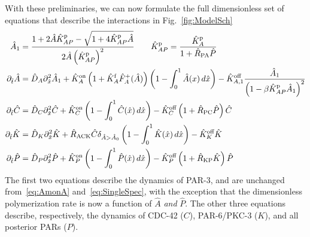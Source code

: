 \documentclass[11pt]{article}
\newcommand{\6}[1]{#1_{\text{6}}}
\newcommand{\3}[1]{#1_{\text{3}}}
\begin{document}
With these preliminaries, we can now formulate the full dimensionless set of equations that describe the  interactions in Fig.\ \ref{fig:ModelSch}
\begin{subequations}
\label{eq:AllBC}
\begin{align}
\nonumber
\hat A_1 &= \frac{1+2\hat A \hat{K}^\text{p}_{AP}-\sqrt{1+4 \hat{K}^\text{p}_{AP} \hat A}}{2 \hat A \left(\hat{K}^\text{p}_{AP}\right)^2} \qquad \hat{K}^\text{p}_{AP}=\frac{\hat{K}^\text{p}_A}{1+\hat R_\text{PA} \hat P}\\ 
\partial_{\hat{t}} \hat A &= \hat{D}_A \partial_{\hat{x}}^2 \hat A_1+\hat{K}^\text{on}_A \left(1+\hat{K}^\text{f}_A \hat F_A^+(\hat A) \right)\left(1 - \int_0^1 \hat A(x) \, d\hat{x} \right) - \hat{K}^\text{off}_{A,1}  \frac{\hat A_1}{\left(1-\beta \hat{K}^\text{p}_{AP} \hat A_1\right)^2}\\
\label{eq:Ceqn}
\partial_{\hat{t}} \hat{C}& =\hat{D}_C \partial_{\hat{x}}^2 \hat{C} +\hat{K}^\text{on}_C \left(1 - \int_0^1 \hat{C}(\hat x) \, d\hat{x} \right)  - \hat{K}^\text{off}_C \left(1+\hat{R}_\text{PC}\hat P\right)\hat{C}\\
\label{eq:Keqn}
\partial_{\hat{t}} \hat{K}  &= \hat{D}_K \partial_{\hat{x}}^2 \hat{K} + \hat{R}_\text{ACK} \hat{C} \delta_{\hat A > \hat A_0} \left(1 - \int_0^1 \hat{K}(\hat x) \, d\hat{x} \right)-\hat{K}^\text{off}_K \hat{K} \\
\partial_{\hat{t}} \hat{P} & =\hat{D}_P \partial_{\hat{x}}^2 \hat{P} +\hat{K}^\text{on}_P \left(1 - \int_0^1 \hat{P}(\hat x) \, d\hat{x} \right)  - \hat{K}^\text{off}_P \left(1+\hat{R}_\text{KP}\hat{K}\right)\hat{P}
\end{align}
\end{subequations}
The first two equations describe the dynamics of PAR-3, and are unchanged from\ \eqref{eq:AmonA} and\ \eqref{eq:SingleSpec}, with the exception that the dimensionless polymerization rate is now a function of $\hat A$ \emph{and} $\hat P$. The other three equations describe, respectively, the dynamics of CDC-42 ($C$), PAR-6/PKC-3 ($K$), and all posterior PARs ($P$). 
\end{document}
